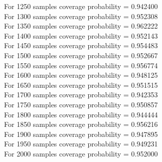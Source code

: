 \documentclass{article}
\begin{document}
For 1250 samples coverage probability = 0.942400\\
For 1300 samples coverage probability = 0.952308\\
For 1350 samples coverage probability = 0.962222\\
For 1400 samples coverage probability = 0.952143\\
For 1450 samples coverage probability = 0.954483\\
For 1500 samples coverage probability = 0.952667\\
For 1550 samples coverage probability = 0.956774\\
For 1600 samples coverage probability = 0.948125\\
For 1650 samples coverage probability = 0.951515\\
For 1700 samples coverage probability = 0.942353\\
For 1750 samples coverage probability = 0.950857\\
For 1800 samples coverage probability = 0.944444\\
For 1850 samples coverage probability = 0.956216\\
For 1900 samples coverage probability = 0.947895\\
For 1950 samples coverage probability = 0.949231\\
For 2000 samples coverage probability = 0.952000\\
\end{document}
